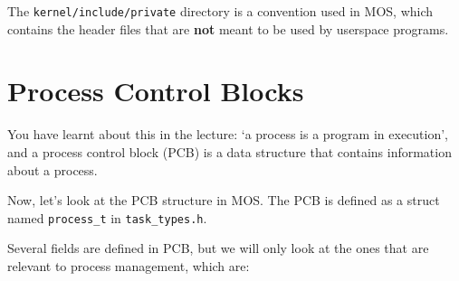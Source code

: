 \begin{note}
    \item The \texttt{kernel/include/private} directory is a convention used in MOS, which
    contains the header files that are \textbf{not} meant to be used by userspace programs.
\end{note}

\section{Process Control Blocks}

You have learnt about this in the lecture: `a process is a program in execution', and a process
control block (PCB) is a data structure that contains information about a process.

Now, let's look at the PCB structure in MOS. The PCB is defined as a struct named \texttt{process\_t}
in \texttt{task\_types.h}.

Several fields are defined in PCB, but we will only look at the ones that are relevant to
process management, which are:

